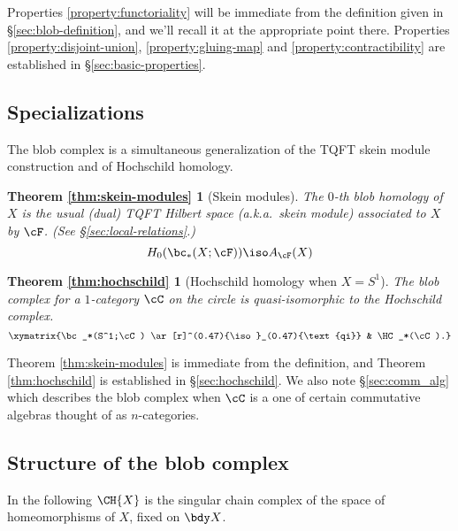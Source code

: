 Properties \ref{property:functoriality} will be immediate from the definition given in
\S \ref{sec:blob-definition}, and we'll recall it at the appropriate point there.
Properties \ref{property:disjoint-union}, \ref{property:gluing-map} and 
\ref{property:contractibility} are established in \S \ref{sec:basic-properties}.

\subsection{Specializations}
\label{sec:specializations}

The blob complex is a simultaneous generalization of the TQFT skein module construction and of Hochschild homology.

\newtheorem*{thm:skein-modules}{Theorem \ref{thm:skein-modules}}

\begin{thm:skein-modules}[Skein modules]
The $0$-th blob homology of $X$ is the usual 
(dual) TQFT Hilbert space (a.k.a.\ skein module) associated to $X$
by $\cF$.
(See \S \ref{sec:local-relations}.)
\begin{equation*}
H_0(\bc_*(X;\cF)) \iso A_{\cF}(X)
\end{equation*}
\end{thm:skein-modules}

\newtheorem*{thm:hochschild}{Theorem \ref{thm:hochschild}}

\begin{thm:hochschild}[Hochschild homology when $X=S^1$]
The blob complex for a $1$-category $\cC$ on the circle is
quasi-isomorphic to the Hochschild complex.
\begin{equation*}
\xymatrix{\bc_*(S^1;\cC) \ar[r]^(0.47){\iso}_(0.47){\text{qi}} & \HC_*(\cC).}
\end{equation*}
\end{thm:hochschild}

Theorem \ref{thm:skein-modules} is immediate from the definition, and
Theorem \ref{thm:hochschild} is established in \S \ref{sec:hochschild}.
We also note \S \ref{sec:comm_alg} which describes the blob complex when $\cC$ is a one of 
certain commutative algebras thought of as $n$-categories.


\subsection{Structure of the blob complex}
\label{sec:structure}

In the following $\CH{X}$ is the singular chain complex of the space of homeomorphisms of $X$, fixed on $\bdy X$.

